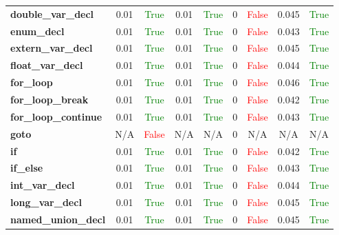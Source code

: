 \documentclass{article}
\begin{document}
\begin{xltabular}{\textwidth}{lcccccccc}
\textbf{{\fontsize{10}{12}\selectfont double\_var\_decl}}& 0.01&\textcolor{green}{True}& 0.01&\textcolor{green}{True}& 0&\textcolor{red}{False}& 0.045&\textcolor{green}{True} \\[0.5ex]
\textbf{{\fontsize{10}{12}\selectfont enum\_decl}}& 0.01&\textcolor{green}{True}& 0.01&\textcolor{green}{True}& 0&\textcolor{red}{False}& 0.043&\textcolor{green}{True} \\[0.5ex]
\textbf{{\fontsize{10}{12}\selectfont extern\_var\_decl}}& 0.01&\textcolor{green}{True}& 0.01&\textcolor{green}{True}& 0&\textcolor{red}{False}& 0.045&\textcolor{green}{True} \\[0.5ex]
\textbf{{\fontsize{10}{12}\selectfont float\_var\_decl}}& 0.01&\textcolor{green}{True}& 0.01&\textcolor{green}{True}& 0&\textcolor{red}{False}& 0.044&\textcolor{green}{True} \\[0.5ex]
\textbf{{\fontsize{10}{12}\selectfont for\_loop}}& 0.01&\textcolor{green}{True}& 0.01&\textcolor{green}{True}& 0&\textcolor{red}{False}& 0.046&\textcolor{green}{True} \\[0.5ex]
\textbf{{\fontsize{10}{12}\selectfont for\_loop\_break}}& 0.01&\textcolor{green}{True}& 0.01&\textcolor{green}{True}& 0&\textcolor{red}{False}& 0.042&\textcolor{green}{True} \\[0.5ex]
\textbf{{\fontsize{10}{12}\selectfont for\_loop\_continue}}& 0.01&\textcolor{green}{True}& 0.01&\textcolor{green}{True}& 0&\textcolor{red}{False}& 0.043&\textcolor{green}{True} \\[0.5ex]
\textbf{{\fontsize{10}{12}\selectfont goto}}& N/A&\textcolor{red}{False}& N/A&N/A& 0&N/A& N/A&N/A \\[0.5ex]
\textbf{{\fontsize{10}{12}\selectfont if}}& 0.01&\textcolor{green}{True}& 0.01&\textcolor{green}{True}& 0&\textcolor{red}{False}& 0.042&\textcolor{green}{True} \\[0.5ex]
\textbf{{\fontsize{10}{12}\selectfont if\_else}}& 0.01&\textcolor{green}{True}& 0.01&\textcolor{green}{True}& 0&\textcolor{red}{False}& 0.043&\textcolor{green}{True} \\[0.5ex]
\textbf{{\fontsize{10}{12}\selectfont int\_var\_decl}}& 0.01&\textcolor{green}{True}& 0.01&\textcolor{green}{True}& 0&\textcolor{red}{False}& 0.044&\textcolor{green}{True} \\[0.5ex]
\textbf{{\fontsize{10}{12}\selectfont long\_var\_decl}}& 0.01&\textcolor{green}{True}& 0.01&\textcolor{green}{True}& 0&\textcolor{red}{False}& 0.045&\textcolor{green}{True} \\[0.5ex]
\textbf{{\fontsize{10}{12}\selectfont named\_union\_decl}}& 0.01&\textcolor{green}{True}& 0.01&\textcolor{green}{True}& 0&\textcolor{red}{False}& 0.045&\textcolor{green}{True} \\[0.5ex]

\end{xltabular}
\end{document}
